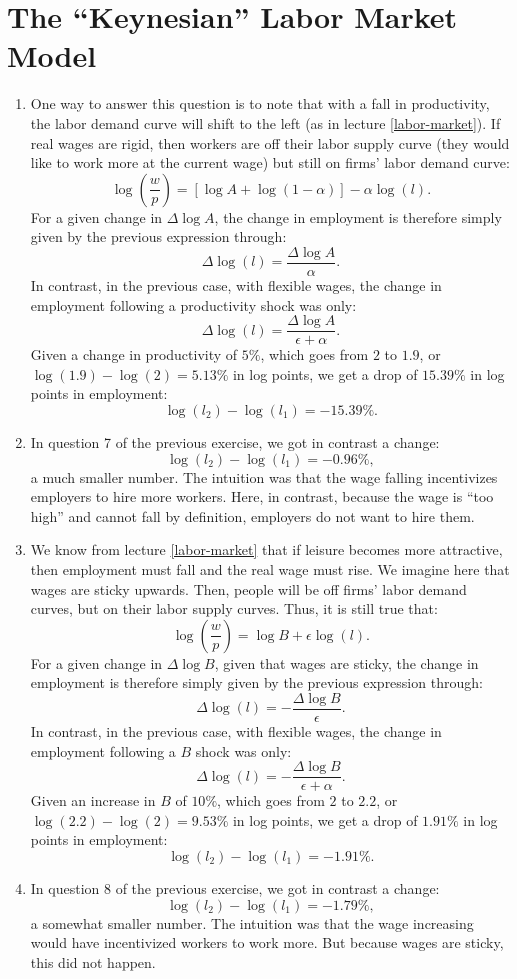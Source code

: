 \documentclass[]{book}
\begin{document}
\section{\texorpdfstring{The ``Keynesian'' Labor Market
Model}{The Keynesian Labor Market Model}}\label{the-keynesian-labor-market-model-1}

\begin{enumerate}
\def\labelenumi{\arabic{enumi}.}
\item
  One way to answer this question is to note that with a fall in
  productivity, the labor demand curve will shift to the left (as in
  lecture \ref{labor-market}). If real wages are rigid, then workers are
  off their labor supply curve (they would like to work more at the
  current wage) but still on firms' labor demand curve:
  \[\log\left(\frac{w}{p}\right) = \left[\log A + \log(1-\alpha)\right] -\alpha \log(l).\]
  For a given change in \(\Delta \log A\), the change in employment is
  therefore simply given by the previous expression through:
  \[\Delta \log(l)=\frac{\Delta \log A}{\alpha}.\] In contrast, in the
  previous case, with flexible wages, the change in employment following
  a productivity shock was only:
  \[\Delta \log(l) = \frac{\Delta \log A}{\epsilon+\alpha}.\] Given a
  change in productivity of \(5\%\), which goes from \(2\) to \(1.9\),
  or \(\log(1.9)-\log(2)=5.13\%\) in log points, we get a drop of
  \(15.39\%\) in log points in employment:
  \[\log(l_2)-\log(l_1)=-15.39\%.\]
\item
  In question 7 of the previous exercise, we got in contrast a change:
  \[\log(l_2)-\log(l_1)=-0.96\%,\] a much smaller number. The intuition
  was that the wage falling incentivizes employers to hire more workers.
  Here, in contrast, because the wage is ``too high'' and cannot fall by
  definition, employers do not want to hire them.
\item
  We know from lecture \ref{labor-market} that if leisure becomes more
  attractive, then employment must fall and the real wage must rise. We
  imagine here that wages are sticky upwards. Then, people will be off
  firms' labor demand curves, but on their labor supply curves. Thus, it
  is still true that:
  \[\log\left(\frac{w}{p}\right)=\log B + \epsilon \log(l).\] For a
  given change in \(\Delta \log B\), given that wages are sticky, the
  change in employment is therefore simply given by the previous
  expression through:
  \[\Delta \log(l)=-\frac{\Delta \log B}{\epsilon}.\] In contrast, in
  the previous case, with flexible wages, the change in employment
  following a \(B\) shock was only:
  \[\Delta \log(l) =- \frac{\Delta \log B}{\epsilon+\alpha}.\] Given an
  increase in \(B\) of \(10\%\), which goes from \(2\) to \(2.2\), or
  \(\log(2.2)-\log(2)=9.53\%\) in log points, we get a drop of
  \(1.91\%\) in log points in employment:
  \[\log(l_2)-\log(l_1)=-1.91\%.\]
\item
  In question 8 of the previous exercise, we got in contrast a change:
  \[\log(l_2)-\log(l_1)=-1.79\%,\] a somewhat smaller number. The
  intuition was that the wage increasing would have incentivized workers
  to work more. But because wages are sticky, this did not happen.
\end{enumerate}
\end{document}
